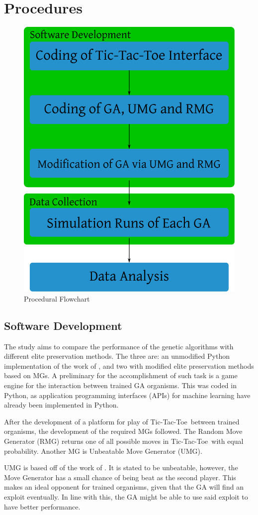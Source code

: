 \documentclass{strrespaper-trad}
\newcommand{\ttt}{Tic-Tac-Toe}
\begin{document}
		\section{Procedures}
			\begin{figure}[htbp]
				\centering
				\includegraphics[width=0.5\linewidth]{../figures/procedural_flowchart}
				\caption{Procedural Flowchart}
				\label{fig:proc_flowchart}
			\end{figure}
			\subsection{Software Development}
				The study aims to compare the performance of the genetic algorithms with different elite preservation methods.
				The three are: an unmodified Python implementation of the work of \textcite{bhattSearchNolossStrategies2008}, and two with modified elite preservation methods based on MGs.
				A preliminary for the accomplishment of such task is a game engine for the interaction between trained GA organisms.
				This was coded in Python, as application programming interfaces (APIs) for machine learning have already been implemented in Python.

				After the development of a platform for play of \ttt\ between trained organisms, the development of the required MGs followed.
				The Random Move Generator (RMG) returns one of all possible moves in \ttt\ with equal probability.
				Another MG is Unbeatable Move Generator (UMG).

				UMG is based off of the work of \textcite{barratRobbiebarratUnbeatableTictactoe2019}.
				It is stated to be unbeatable, however, the Move Generator has a small chance of being beat as the second player.
				This makes an ideal opponent for trained organisms, given that the GA will find an exploit eventually.
				In line with this, the GA might be able to use said exploit to have better performance.
\end{document}
